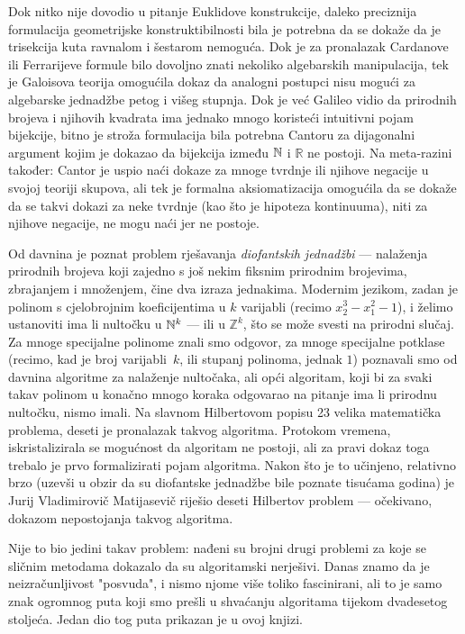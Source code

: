 Dok nitko nije dovodio u pitanje Euklidove konstrukcije, daleko preciznija formulacija geometrijske konstruktibilnosti bila je potrebna da se dokaže da je trisekcija kuta ravnalom i šestarom nemoguća. Dok je za pronalazak Cardanove ili Ferrarijeve formule bilo dovoljno znati nekoliko algebarskih manipulacija, tek je Galoisova teorija omogućila dokaz da analogni postupci nisu mogući za algebarske jednadžbe petog i višeg stupnja. Dok je već Galileo vidio da prirodnih brojeva i njihovih kvadrata ima jednako mnogo koristeći intuitivni pojam bijekcije, bitno je stroža formulacija bila potrebna Cantoru za dijagonalni argument kojim je dokazao da bijekcija između ${\mathbb N}$ i $\mathbb R$ ne postoji. Na meta-razini također: Cantor je uspio naći dokaze za mnoge tvrdnje ili njihove negacije u svojoj teoriji skupova, ali tek je formalna aksiomatizacija omogućila da se dokaže da se takvi dokazi za neke tvrdnje (kao što je hipoteza kontinuuma), niti za njihove negacije, ne mogu naći jer ne postoje.

Od davnina je poznat problem rješavanja \emph{diofantskih jednadžbi} --- nalaženja prirodnih brojeva koji zajedno s još nekim fiksnim prirodnim brojevima, zbrajanjem i množenjem, čine dva izraza jednakima. Modernim jezikom, zadan je polinom s cjelobrojnim koeficijentima u $k$ varijabli (recimo $x_2^3-x_1^2-1$), i želimo ustanoviti ima li nultočku u ${\mathbb N}^k$ --- ili u $\mathbb Z^k$, što se može svesti na prirodni slučaj. Za mnoge specijalne polinome znali smo odgovor, za mnoge specijalne potklase (recimo, kad je broj varijabli~$k$, ili stupanj polinoma, jednak $1$) poznavali smo od davnina algoritme za nalaženje nultočaka, ali opći algoritam, koji bi za svaki takav polinom u konačno mnogo koraka odgovarao na pitanje ima li prirodnu nultočku, nismo imali. Na slavnom Hilbertovom popisu 23 velika matematička problema, deseti je pronalazak takvog algoritma. Protokom vremena, iskristalizirala se mogućnost da algoritam ne postoji, ali za pravi dokaz toga trebalo je prvo formalizirati pojam algoritma. Nakon što je to učinjeno, relativno brzo (uzevši u obzir da su diofantske jednadžbe bile poznate tisućama godina) je Jurij Vladimirovič Matijasevič riješio deseti Hilbertov problem --- očekivano, dokazom nepostojanja takvog algoritma.

Nije to bio jedini takav problem: nađeni su brojni drugi problemi za koje se sličnim metodama dokazalo da su algoritamski nerješivi. Danas znamo da je neizračunljivost "posvuda", i nismo njome više toliko fascinirani, ali to je samo znak ogromnog puta koji smo prešli u shvaćanju algoritama tijekom dvadesetog stoljeća. Jedan dio tog puta prikazan je u ovoj knjizi.


